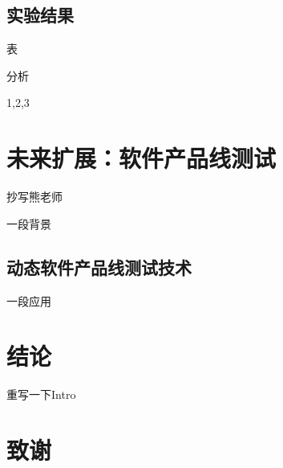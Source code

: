 \documentclass[nofonts]{ctexrep}
\begin{document}
\section{实验结果}
表

分析

1,2,3

\chapter{未来扩展：软件产品线测试}
抄写熊老师

一段背景

\section{动态软件产品线测试技术}
一段应用

\chapter{结论}
重写一下Intro




\chapter*{致谢}
\end{document}
